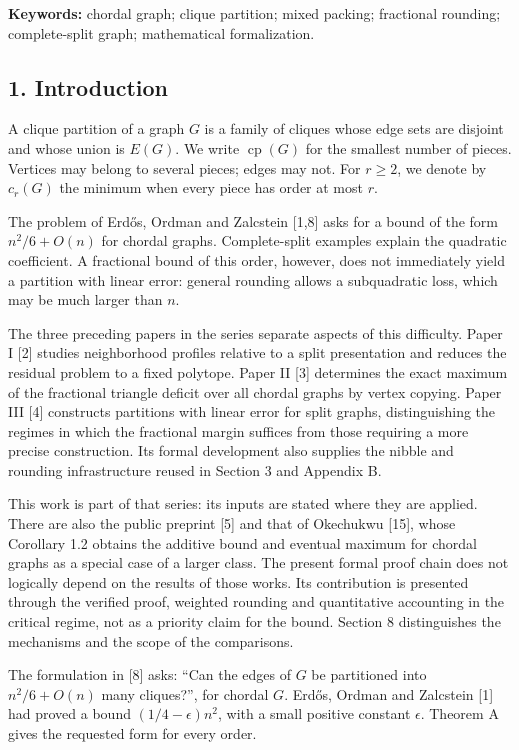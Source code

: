 \documentclass[english,11pt,a4paper]{article}
\begin{document}
\textbf{Keywords:} chordal graph; clique partition; mixed packing; fractional rounding; complete-split graph; mathematical formalization.

\subsection{1. Introduction}\label{introduction}

A clique partition of a graph \(G\) is a family of cliques whose edge sets are disjoint and whose union is \(E(G)\). We write \(\operatorname{cp}(G)\) for the smallest number of pieces. Vertices may belong to several pieces; edges may not. For \(r\ge2\), we denote by \(c_r(G)\) the minimum when every piece has order at most \(r\).

The problem of Erdős, Ordman and Zalcstein {[}1,8{]} asks for a bound of the form \(n^2/6+O(n)\) for chordal graphs. Complete-split examples explain the quadratic coefficient. A fractional bound of this order, however, does not immediately yield a partition with linear error: general rounding allows a subquadratic loss, which may be much larger than \(n\).

The three preceding papers in the series separate aspects of this difficulty. Paper I {[}2{]} studies neighborhood profiles relative to a split presentation and reduces the residual problem to a fixed polytope. Paper II {[}3{]} determines the exact maximum of the fractional triangle deficit over all chordal graphs by vertex copying. Paper III {[}4{]} constructs partitions with linear error for split graphs, distinguishing the regimes in which the fractional margin suffices from those requiring a more precise construction. Its formal development also supplies the nibble and rounding infrastructure reused in Section 3 and Appendix B.

This work is part of that series: its inputs are stated where they are applied. There are also the public preprint {[}5{]} and that of Okechukwu {[}15{]}, whose Corollary 1.2 obtains the additive bound and eventual maximum for chordal graphs as a special case of a larger class. The present formal proof chain does not logically depend on the results of those works. Its contribution is presented through the verified proof, weighted rounding and quantitative accounting in the critical regime, not as a priority claim for the bound. Section 8 distinguishes the mechanisms and the scope of the comparisons.

The formulation in {[}8{]} asks: ``Can the edges of \(G\) be partitioned into \(n^2/6+O(n)\) many cliques?'', for chordal \(G\). Erdős, Ordman and Zalcstein {[}1{]} had proved a bound \((1/4-\epsilon)n^2\), with a small positive constant \(\epsilon\). Theorem A gives the requested form for every order.
\end{document}
